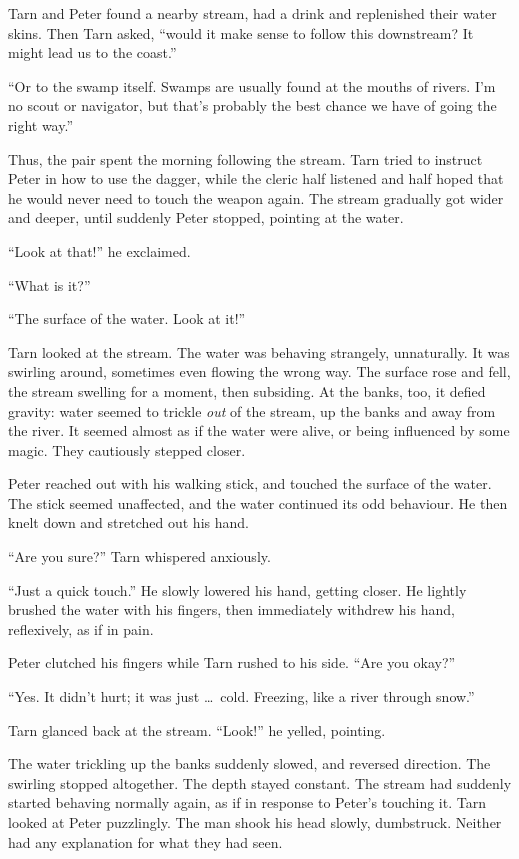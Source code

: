 

Tarn and Peter found a nearby stream, had a drink and replenished their water skins.  Then Tarn asked, ``would it make sense to follow this downstream?  It might lead us to the coast.''

``Or to the swamp itself.  Swamps are usually found at the mouths of rivers.  I'm no scout or navigator, but that's probably the best chance we have of going the right way.''

Thus, the pair spent the morning following the stream.  Tarn tried to instruct Peter in how to use the dagger, while the cleric half listened and half hoped that he would never need to touch the weapon again.  The stream gradually got wider and deeper, until suddenly Peter stopped, pointing at the water.

``Look at that!'' he exclaimed.

``What is it?''

``The surface of the water.  Look at it!''

Tarn looked at the stream.  The water was behaving strangely, unnaturally.  It was swirling around, sometimes even flowing the wrong way.  The surface rose and fell, the stream swelling for a moment, then subsiding.  At the banks, too, it defied gravity: water seemed to trickle \emph{out} of the stream, up the banks and away from the river.  It seemed almost as if the water were alive, or being influenced by some magic.  They cautiously stepped closer.

Peter reached out with his walking stick, and touched the surface of the water.  The stick seemed unaffected, and the water continued its odd behaviour.  He then knelt down and stretched out his hand.

``Are you sure?'' Tarn whispered anxiously.

``Just a quick touch.''  He slowly lowered his hand, getting closer.  He lightly brushed the water with his fingers, then immediately withdrew his hand, reflexively, as if in pain.

Peter clutched his fingers while Tarn rushed to his side.  ``Are you okay?''

``Yes.  It didn't hurt; it was just \ldots\ cold.  Freezing, like a river through snow.''

Tarn glanced back at the stream.  ``Look!'' he yelled, pointing.

The water trickling up the banks suddenly slowed, and reversed direction.  The swirling stopped altogether.  The depth stayed constant.  The stream had suddenly started behaving normally again, as if in response to Peter's touching it.  Tarn looked at Peter puzzlingly.  The man shook his head slowly, dumbstruck.  Neither had any explanation for what they had seen.

